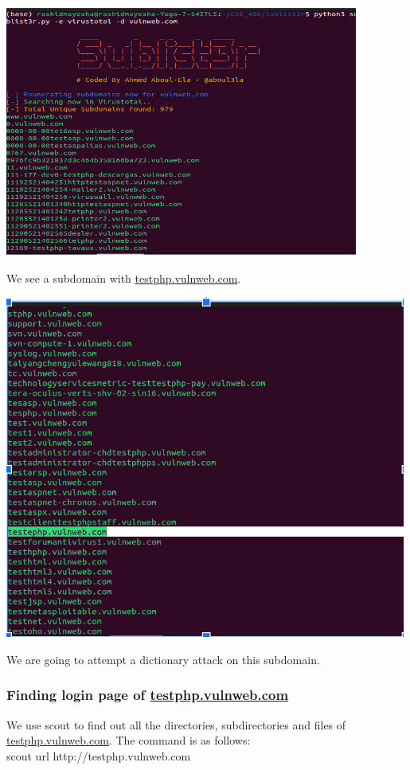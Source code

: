 \documentclass[12pt]{article}
\begin{document}
\begin{center}
    \includegraphics[max width=\textwidth]{Image7.png}
\end{center}

We see a subdomain with \href{http://testphp.vulnweb.com}{testphp.vulnweb.com}.

\begin{center}
    \includegraphics[max width=\textwidth]{Image8.png}
\end{center}

We are going to attempt a dictionary attack on this subdomain.

\subsubsection{Finding login page of \href{http://testphp.vulnweb.com}{testphp.vulnweb.com}}\label{subsubsec:finding-login-page-of-testphp.vulnweb.com}
We use scout to find out all the directories, subdirectories and files of \href{http://testphp.vulnweb.com}{testphp.vulnweb.com}. The command is as follows:\\
scout url http://testphp.vulnweb.com
\end{document}
